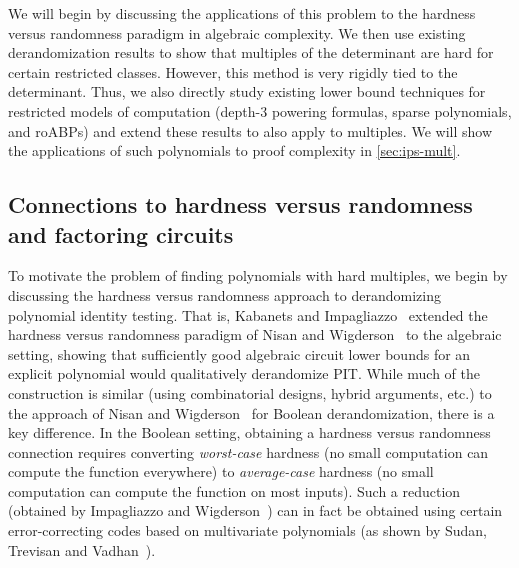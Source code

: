 \documentclass[11pt]{article}
\numberwithin{equation}{section}
\theoremstyle{definition}
\theoremstyle{plain}
\begin{document}
We will begin by discussing the applications of this problem to the hardness versus randomness paradigm in algebraic complexity.  We then use existing derandomization results to show that multiples of the determinant are hard for certain restricted classes. However, this method is very rigidly tied to the determinant.  Thus, we also directly study existing lower bound techniques for restricted models of computation (depth-$3$ powering formulas, sparse polynomials, and roABPs) and extend these results to also apply to multiples.  We will show the applications of such polynomials to proof complexity in \autoref{sec:ips-mult}.

\subsection{Connections to hardness versus randomness and factoring circuits}\label{sec:lbs-mult:hard-v-rand}

To motivate the problem of finding polynomials with hard multiples, we begin by discussing the hardness versus randomness approach to derandomizing polynomial identity testing.  That is, Kabanets and Impagliazzo~\cite{KabanetsImpagliazzo04} extended the hardness versus randomness paradigm of Nisan and Wigderson~\cite{NisanWigderson94} to the algebraic setting, showing that sufficiently good algebraic circuit lower bounds for an explicit polynomial would qualitatively derandomize PIT\@.  While much of the construction is similar (using combinatorial designs, hybrid arguments, etc.) to the approach of Nisan and Wigderson~\cite{NisanWigderson94} for Boolean derandomization, there is a key difference.  In the Boolean setting, obtaining a hardness versus randomness connection requires converting \emph{worst-case} hardness (no small computation can compute the function everywhere) to \emph{average-case} hardness (no small computation can compute the function on most inputs).  Such a reduction (obtained by Impagliazzo and Wigderson~\cite{ImpagliazzoWigderson97}) can in fact be obtained using certain error-correcting codes based on multivariate polynomials (as shown by Sudan, Trevisan and Vadhan~\cite{SudanTV01}).
\end{document}
